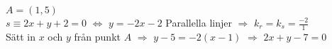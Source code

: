 $A=(1,5)$\\
$s \equiv 2x+y+2=0$ $\Leftrightarrow$ $y=-2x-2$
\noindent
Parallella linjer $\Rightarrow$ $k_{r} = k_{s} = \frac{-2}{1}$\\
Sätt in $x$ och $y$ från punkt $A$ $\Rightarrow$ $y-5 = -2(x-1)$ $\Rightarrow$ 
$2x+y-7=0$\\